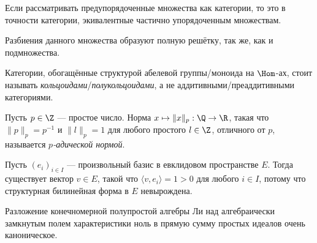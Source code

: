 \documentclass[
	extrafontsizes,
	11pt,
	hyphens,
]{memoir}
\begin{document}
\begin{observation}
Если рассматривать предупорядоченные множества как категории, то это в точности категории, экивалентные частично упорядоченным множествам.
\end{observation}

\begin{observation}
Разбиения данного множества образуют полную решётку, так же, как и подмножества.
\end{observation}

\begin{convention}
Категории, обогащённые структурой абелевой группы/моноида на \(\Hom\)-ах, стоит называть \emph{коль\-цо\-и\-да\-ми}/\emph{по\-лу\-коль\-цо\-и\-да\-ми}, а не аддитивными/пре\-ад\-ди\-тив\-ны\-ми категориями.
\end{convention}

\begin{definition}
Пусть \(p \in \Z\) --- простое число.
Норма \(x \mapsto \lVert x \rVert_p : \Q \to \R\), такая что \(\lVert p \rVert_p = p^{-1}\) и \(\lVert l \rVert_p = 1\) для любого простого \(l \in \Z\), отличного от \(p\), называется \emph{\(p\)-адической нормой}.
\end{definition}

%

\begin{observation}
Пусть \((e_i)_{i \in I}\) --- произвольный базис в евклидовом пространстве \(E\). Тогда существует вектор \(v \in E\), такой что \(\langle v, e_i \rangle = 1 > 0\) для любого \(i \in I\), потому что структурная билинейная форма в \(E\) невырождена.
\end{observation}

\begin{observation}
Разложение конечномерной полупростой алгебры Ли над алгебраически замкнутым полем характеристики ноль в прямую сумму простых идеалов очень каноническое.
\end{observation}
\end{document}
